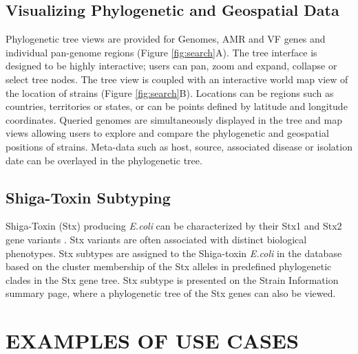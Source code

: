 \documentclass[a4paper,twoside]{article}
\begin{document}
\subsection{Visualizing Phylogenetic and Geospatial Data}

Phylogenetic tree views are provided for Genomes, AMR and VF genes and individual pan-genome regions (Figure \ref{fig:search}A). The tree interface is designed to be highly interactive; users can pan, zoom and expand, collapse or select tree nodes. The tree view is coupled with an interactive world map view of the location of strains (Figure \ref{fig:search}B). Locations can be regions such as countries, territories or states, or can be points defined by latitude and longitude coordinates. Queried genomes are simultaneously displayed in the tree and map views allowing users to explore and compare the phylogenetic and geospatial positions of strains. Meta-data such as host, source, associated disease or isolation date can be overlayed in the phylogenetic tree.

\subsection{Shiga-Toxin Subtyping}

Shiga-Toxin (Stx) producing \textit{E.coli} can be characterized by their Stx1 and Stx2 gene variants \cite{scheutz_multicenter_2012}. Stx variants are often associated with distinct biological phenotypes. Stx subtypes are assigned to the Shiga-toxin \textit{E.coli} in the database based on the cluster membership of the Stx alleles in predefined phylogenetic clades in the Stx gene tree. Stx subtype is presented on the Strain Information summary page, where a phylogenetic tree of the Stx genes can also be viewed.

\section{\uppercase{Examples of Use Cases}}
\label{sec:cases}
\end{document}
